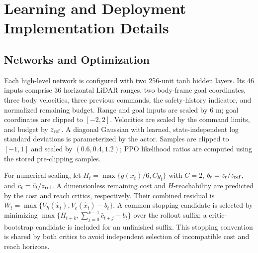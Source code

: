 \documentclass[conference]{IEEEtran}
\begin{document}
\section{Learning and Deployment Implementation Details}
\label{app:learning_details}
\subsection{Networks and Optimization}
Each high-level network is configured with two 256-unit tanh hidden layers. Its 46 inputs
comprise 36 horizontal LiDAR ranges, two body-frame goal coordinates, three
body velocities, three previous commands, the safety-history indicator, and
normalized remaining budget. Range and goal inputs are scaled by 6 m; goal
coordinates are clipped to $[-2,2]$. Velocities are scaled by the command limits,
and budget by $z_{\rm ref}$. A diagonal Gaussian with learned, state-independent
log standard deviations is parameterized by the actor. Samples are clipped to $[-1,1]$
and scaled by $(0.6,0.4,1.2)$; PPO likelihood ratios are computed using the stored
pre-clipping samples.

For numerical scaling, let $H_t=\max\{g(x_t)/6,Cy_t\}$ with $C=2$,
$b_t=z_t/z_{\rm ref}$, and $\bar c_t=\tilde c_t/z_{\rm ref}$.
A dimensionless remaining cost and $H$-reachability are predicted by the cost
and reach critics, respectively. Their combined residual is
$W_t=\max\{V_h(\hat x_t),V_c(\hat x_t)-b_t\}$.
A common stopping candidate is selected by minimizing
$\max\{H_{t+k},\sum_{j=0}^{k-1}\bar c_{t+j}-b_t\}$ over the rollout suffix;
a critic-bootstrap candidate is included for an unfinished suffix. This stopping
convention is shared by both critics to avoid independent selection of incompatible
cost and reach horizons.
\end{document}
